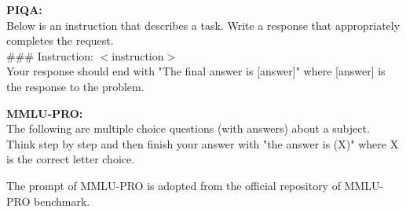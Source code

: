 
\medskip
\begin{tcolorbox}[colback=gray!5, colframe=gray!50, boxrule=0.5pt, arc=2pt]
\textbf{PIQA:} \\

Below is an instruction that describes a task. Write a response that appropriately completes the request. \\

\#\#\# Instruction:  
$<$instruction$>$ \\

Your response should end with  
"The final answer is [answer]"  
where [answer] is the response to the problem.
\end{tcolorbox}

\medskip
\begin{tcolorbox}[colback=gray!5, colframe=gray!50, boxrule=0.5pt, arc=2pt]
\textbf{MMLU-PRO:} \\

The following are multiple choice questions (with answers) about a subject. Think step by step and then finish your answer with "the answer is (X)" where X is the correct letter choice.
\end{tcolorbox}
The prompt of MMLU-PRO is adopted from the official repository of MMLU-PRO benchmark. 





